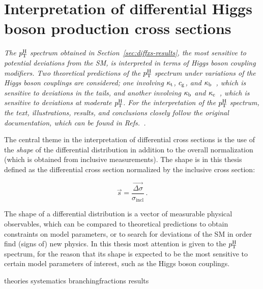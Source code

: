\section{Interpretation of differential Higgs boson production cross sections}
\label{sec:interpretation}

\emph{%
The $p_\mathrm{T}^\mathrm{H}$ spectrum obtained in Section~\ref{sec:diffxs-results}, the most sensitive to potential deviations from the SM, is interpreted in terms of Higgs boson coupling modifiers.
% 
Two theoretical predictions of the $p_\mathrm{T}^\mathrm{H}$ spectrum under variations of the Higgs boson couplings are considered; one involving $\kappa_{\mathrm{t}}$, $c_\mathrm{g}$, and $\kappa_{\mathrm{b}}$~\cite{Grazzini:2017szg,Grazzini:2016paz}, which is sensitive to deviations in the tails, and another involving $\kappa_{\mathrm{b}}$ and $\kappa_{\mathrm{c}}$~\cite{Bishara:2016jga}, which is sensitive to deviations at moderate $p_\mathrm{T}^\mathrm{H}$.
% 
For the interpretation of the $p_\mathrm{T}^\mathrm{H}$ spectrum, the text, illustrations, results, and conclusions closely follow the original documentation, which can be found in Refs.~\cite{AN-17-244,HIG-17-028}.
}


The central theme in the interpretation of differential cross sections is the use of the \emph{shape} of the differential distribution in addition to the overall normalization (which is obtained from inclusive measurements).
% 
The shape is in this thesis defined as the differential cross section normalized by the inclusive cross section:
% 
\begin{linenomath*}
\begin{equation}
\label{eq:interpretation-shape}
\vec{s} = \frac{\vec{\Delta\sigma}}{\sigma_\text{incl}}
\,.
\end{equation}
\end{linenomath*}
% 
The shape of a differential distribution is a vector of measurable physical observables, which can be compared to theoretical predictions to obtain constraints on model parameters, or to search for deviations of the SM in order find (signs of) new physics.
% 
In this thesis most attention is given to the $p_\mathrm{T}^\mathrm{H}$ spectrum, for the reason that its shape is expected to be the most sensitive to certain model parameters of interest, such as the Higgs boson couplings.



{theories}
{systematics}
{branchingfractions}
{results}